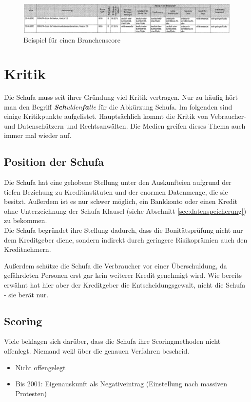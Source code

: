 \documentclass[12pt]{article}
\begin{document}
\begin{figure}
	\centering
		\includegraphics{branchenscore}
	\caption{Beispiel für einen Branchenscore}
	\label{fig:bsp-branchenscore}
\end{figure}






\section{Kritik}

Die Schufa muss seit ihrer Gründung viel Kritik vertragen. Nur zu häufig hört man den Begriff \textit{\textbf{Sch}ulden\textbf{fa}lle} für die Abkürzung Schufa. Im folgenden sind einige Kritikpunkte aufgelistet.
Hauptsächlich kommt die Kritik von Vebraucher- und Datenschützern und Rechtsanwälten. Die Medien greifen dieses Thema auch immer mal wieder auf.

\subsection{Position der Schufa}

Die Schufa hat eine gehobene Stellung unter den Auskunfteien aufgrund der tiefen Beziehung zu Kreditinstituten und der enormen Datenmenge, die sie besitzt. Außerdem ist es nur schwer möglich,
ein Bankkonto oder einen Kredit ohne Unterzeichnung der Schufa-Klausel (siehe Abschnitt \ref{sec:datenspeicherung}) zu bekommen.\\

Die Schufa begründet ihre Stellung dadurch, dass die Bonitätsprüfung nicht nur dem Kreditgeber diene, sondern indirekt durch geringere Risikoprämien auch den Kreditnehmern.

Außerdem schütze die Schufa die Verbraucher vor einer Überschuldung, da gefährdeten Personen erst gar kein weiterer Kredit genehmigt wird. Wie bereits erwähnt hat hier aber der Kreditgeber die 
Entscheidungsgewalt, nicht die Schufa - sie berät nur.

\subsection{Scoring}

Viele beklagen sich darüber, dass die Schufa ihre Scoringmethoden nicht offenlegt. Niemand weiß über die genauen Verfahren bescheid.
\begin{itemize}
\item Nicht offengelegt
\item Bis 2001: Eigenauskunft als Negativeintrag (Einstellung nach massiven Protesten)
\end{itemize}
\end{document}
